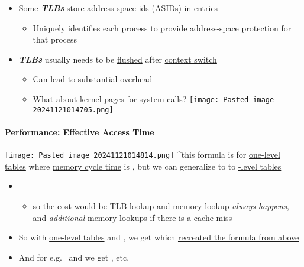 \begin{itemize}
\tightlist
\item
  Some \textbf{\textit{TLBs}} store \ul{address-space ids (ASIDs)} in
  entries

  \begin{itemize}
  \tightlist
  \item
    Uniquely identifies each process to provide address-space protection
    for that process
  \end{itemize}
\item
  \textbf{\textit{TLBs}} usually needs to be \ul{flushed} after
  \ul{context switch}

  \begin{itemize}
  \tightlist
  \item
    Can lead to substantial overhead
  \item
    What about kernel pages for system calls?
    \texttt{[image: Pasted image 20241121014705.png]}
  \end{itemize}
\end{itemize}

\paragraph*{Performance: Effective Access Time}

\texttt{[image: Pasted image 20241121014814.png]} \^{}this formula is
for \ul{one-level tables} where \ul{memory cycle time}  is
, but we can generalize to to \ul{-level
tables}

\begin{itemize}
\tightlist
\item

  \begin{itemize}
  \tightlist
  \item
    so the cost would be  \ul{TLB lookup} and 
    \ul{memory lookup} \textit{always happens}, and 
    \textit{additional} \ul{memory lookups} if there is a \ul{cache
    miss}
  \end{itemize}
\item
  So with \ul{one-level tables}  and , we get
   which \ul{recreated the formula
  from above}
\item
  And for e.g.~ and  we get
  , etc.
\end{itemize}

